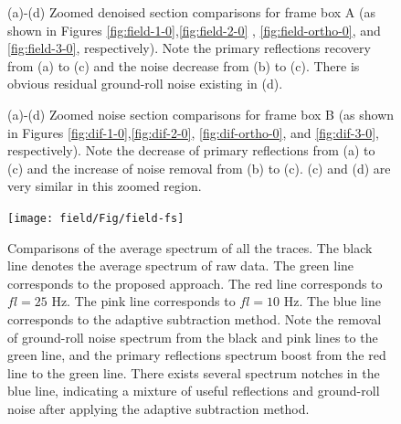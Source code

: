 \begin{figure}[htb!]
  \centering
	\caption{(a)-(d) Zoomed denoised section comparisons for frame box A (as shown in Figures \ref{fig:field-1-0},\ref{fig:field-2-0} , \ref{fig:field-ortho-0}, and \ref{fig:field-3-0}, respectively). Note the primary reflections recovery from (a) to (c) and the noise decrease from (b) to (c). There is obvious residual ground-roll noise existing in (d).}
   \label{fig:zooma-1,zooma-2,zooma-ortho,zooma-3}
\end{figure}


\begin{figure}[htb!]
  \centering
	\caption{(a)-(d) Zoomed noise section comparisons for frame box B (as shown in Figures \ref{fig:dif-1-0},\ref{fig:dif-2-0}, \ref{fig:dif-ortho-0}, and \ref{fig:dif-3-0}, respectively). Note the decrease of primary reflections from (a) to (c) and the increase of noise removal from (b) to (c). (c) and (d) are very similar in this zoomed region.}
   \label{fig:zoomb-1,zoomb-2,zoomb-ortho,zoomb-3}
\end{figure}

\begin{figure}[htb!]
  \centering
    \texttt{[image: field/Fig/field-fs]}
	\caption{Comparisons of the average spectrum of all the traces. The black line denotes the average spectrum of raw data. The green line corresponds to the proposed approach. The red line corresponds to $fl=25$ Hz. The pink line corresponds to $fl=10$ Hz. The blue line corresponds to the adaptive subtraction method. Note the removal of ground-roll noise spectrum from the black and pink lines to the green line, and the primary reflections spectrum boost from the red line to the green line. There exists several spectrum notches in the blue line, indicating a mixture of useful reflections and ground-roll noise after applying the adaptive subtraction method. }
   \label{fig:field-fs}
\end{figure}



